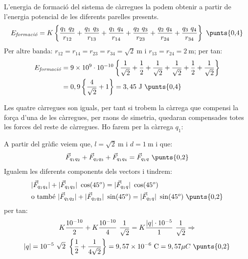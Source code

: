 \begin{solapartat}
L'energia de formació del sistema de càrregues la podem obtenir a partir de l'energia potencial de les diferents parelles presents. 
\[ E_{\textit{formació}} = K\left\{\frac{q_1\ q_2}{r_{12}} + \frac{q_1\ q_3}{r_{13}} + \frac{q_1\ q_4}{r_{14}} + \frac{q_2\ q_3}{r_{23}} + \frac{q_2\ q_4}{r_{24}} + \frac{q_3\ q_4}{r_{34}}\right\} \ \text{\punts{0,4}} \]
Per altre banda: $r_{12} = r_{14} = r_{23} = r_{34} = \sqrt{2}\ \mathrm{m}$ i $r_{13} = r_{24} = 2\ \mathrm{m}$; per tan:
\begin{align*}
E_{\textit{formació}} &= 9\times 10^{9}\cdot 10^{-10}\left\{\frac{1}{\sqrt{2}} + \frac{1}{2} + \frac{1}{\sqrt{2}} + \frac{1}{\sqrt{2}} + \frac{1}{2} + \frac{1}{\sqrt{2}}\right\}\\
&= 0,9\left\{\frac{4}{\sqrt{2}} + 1\right\} = 3,45\ \mathrm{J} \ \text{\punts{0,4}}
\end{align*}
\end{solapartat}

\begin{solapartat}
Les quatre càrregues son iguals, per tant si trobem la càrrega que compensi la força d'una de les càrregues, per raons de simetria, quedaran compensades totes les forces del reste de càrregues.  Ho farem per la càrrega $q_1$:


A partir del gràfic veiem que, $l = \sqrt{2}\ \mathrm{m}$ i $d = 1\ \mathrm{m}$ i que:
\[ \vec{F}_{q_1q_2} + \vec{F}_{q_1q_3} + \vec{F}_{q_1q_4} = \vec{F}_{q_1q} \ \text{\punts{0,2}} \]
Igualem les diferents components dels vectors i tindrem:
\begin{align*}
&|\vec{F}_{q_1q_4}| + |\vec{F}_{q_1q_3}|\ \cos(45^o) = |\vec{F}_{q_1q}|\ \cos(45^o)\\
&\text{o també } |\vec{F}_{q_1q_2}| + |\vec{F}_{q_1q_3}|\ \sin(45^o) = |\vec{F}_{q_1q}|\ \sin(45^o) \ \text{\punts{0,2}}
\end{align*}
per tan:
\begin{gather*}
K\frac{10^{-10}}{2} + K\frac{10^{-10}}{4}\ \frac{1}{\sqrt{2}} = K\frac{|q|\cdot 10^{-5}}{1}\ \frac{1}{\sqrt{2}} \Rightarrow\\
|q| = 10^{-5}\ \sqrt{2}\ \left\{\frac{1}{2} + \frac{1}{4\sqrt{2}}\right\} = 9,57\times 10^{-6}\ \mathrm{C} = 9,57\mu C \ \text{\punts{0,2}}
\end{gather*}
\end{solapartat}
